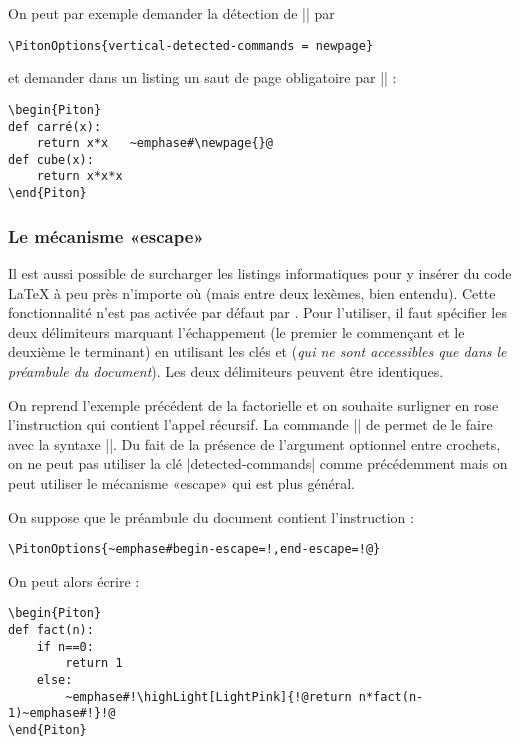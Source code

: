 \documentclass[dvipsnames,svgnames]{article}
\begin{document}
\smallskip
On peut par exemple demander la détection de |\newpage| par

\begin{Verbatim}
\PitonOptions{vertical-detected-commands = newpage}
\end{Verbatim}

et demander dans un listing un saut de page obligatoire par |\newpage{}| :

\begin{Verbatim}
\begin{Piton}
def carré(x):
    return x*x   ~emphase#\newpage{}@
def cube(x):
    return x*x*x
\end{Piton}    
\end{Verbatim}



\subsubsection{Le mécanisme «escape»}

\label{escape}

Il est aussi possible de surcharger les listings informatiques pour y insérer du code
LaTeX à peu près n'importe où (mais entre deux lexèmes, bien entendu). Cette
fonctionnalité n'est pas activée par défaut par . Pour l'utiliser, il faut
spécifier les deux délimiteurs marquant l'échappement (le premier le commençant et le
deuxième le terminant) en utilisant les clés  et
 (\emph{qui ne sont accessibles que dans le préambule du
  document}). Les deux délimiteurs peuvent être identiques.

\medskip
On reprend l'exemple précédent de la factorielle et on souhaite surligner en rose
l'instruction qui contient l'appel récursif. La commande |\highLight| de 
permet de le faire avec la syntaxe ||. Du fait de la présence de
l'argument optionnel entre crochets, on ne peut pas utiliser la clé |detected-commands|
comme précédemment mais on peut utiliser le mécanisme «escape» qui est plus général.

\smallskip
On suppose que le préambule du document contient l'instruction :

\begin{Verbatim}
\PitonOptions{~emphase#begin-escape=!,end-escape=!@}
\end{Verbatim}

On peut alors écrire :
\begin{Verbatim}
\begin{Piton}
def fact(n):
    if n==0:
        return 1
    else:
        ~emphase#!\highLight[LightPink]{!@return n*fact(n-1)~emphase#!}!@
\end{Piton}
\end{Verbatim}
\end{document}
